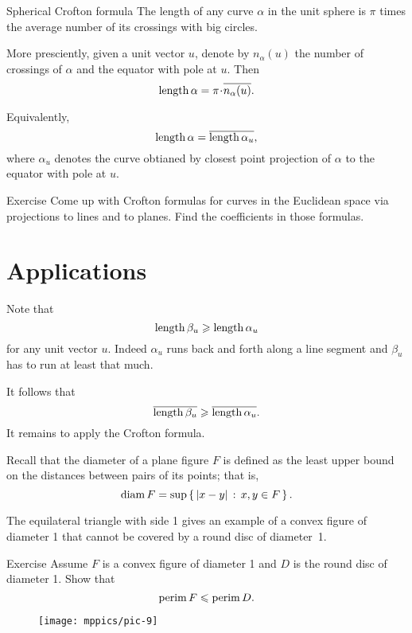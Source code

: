 \begin{thm}{Spherical Crofton formula}\label{thm:crofton-sphere}
The length of any curve $\alpha$ in the unit sphere is $\pi$ times the average number of its crossings with big circles.

More presciently, given a unit vector $u$, denote by $n_\alpha(u)$ the number of crossings of $\alpha$ and the equator with pole at $u$.
Then 
\[\length\alpha=\pi\cdot\overline{n_\alpha(u)}.\]

Equivalently,
\[\mathop{\rm length}\nolimits\alpha=\overline{\mathop{\rm length}\nolimits\alpha_u},\]
where $\alpha_u$ denotes the curve obtianed by closest point projection of $\alpha$ to the equator with pole at $u$.
\end{thm}


\begin{thm}{Exercise}\label{ex:3d-crofton}
Come up with Crofton formulas for curves in the Euclidean space via projections to lines and to planes.
Find the coefficients in those formulas.
\end{thm}

\section{Applications}

Note that 
\[\mathop{\rm length}\nolimits \beta_u\geqslant \mathop{\rm length}\nolimits \alpha_u\]
for any unit vector $u$.
Indeed $\alpha_u$ runs back and forth along a line segment and $\beta_u$ has to run at least that much.

It follows that 
\[\overline{\mathop{\rm length}\nolimits \beta_u}\geqslant \overline{\mathop{\rm length}\nolimits \alpha_u}.\]
It remains to apply the Crofton formula.
\qeds


Recall that the diameter of a plane figure $F$ is defined as the least upper bound on the distances between pairs of its points;
that is,
\[\mathop{\rm diam}\nolimits F=\sup\left\{\,{|x-y|}\,:\,{x,y\in F}\,\right\}.\]

The equilateral triangle with side 1 gives an example of a convex figure of diameter 1 that cannot be covered by a round disc of diameter~1.

\begin{thm}{Exercise} 
Assume $F$ is a convex figure of diameter 1 and $D$ is the round disc of diameter 1.
Show that
\[\mathop{\rm perim}\nolimits F\leqslant \mathop{\rm perim}\nolimits D.\]
\end{thm}

\begin{wrapfigure}{r}{33 mm}
\vskip-5mm
\centering
\texttt{[image: mppics/pic-9]}
\end{wrapfigure}

